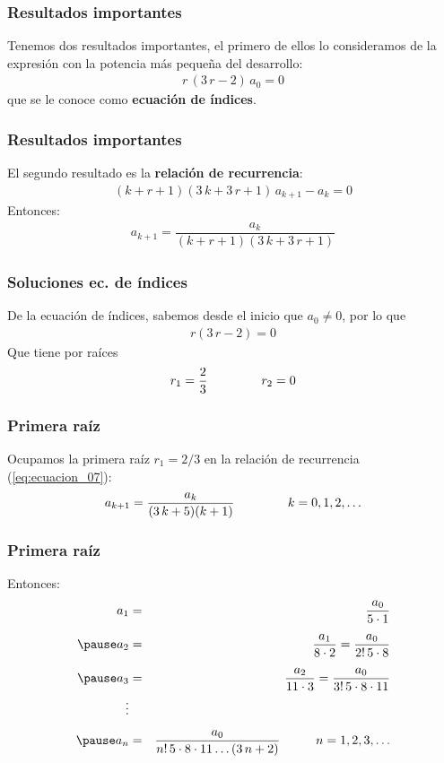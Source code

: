 \begin{frame}
\frametitle{Resultados importantes}
Tenemos dos resultados importantes, el primero de ellos lo consideramos de la expresión con la potencia más pequeña del desarrollo:
\begin{align*}
r \, (3 \, r - 2) \, a_{0} = 0
\end{align*}
que se le conoce como \textbf{ecuación de índices}.
\end{frame}
\begin{frame}
\frametitle{Resultados importantes}
El segundo resultado es la \textbf{relación de recurrencia}:
\begin{align*}
(k + r + 1)(3 \, k + 3 \, r + 1) \, a_{k+1} - a_{k} = 0
\end{align*}
\pause
Entonces:
\begin{align}
a_{k+1} = \dfrac{a_{k}}{(k + r + 1)(3 \, k + 3 \, r + 1)}
\label{eq:ecuacion_07}
\end{align}
\end{frame}
\begin{frame}
\frametitle{Soluciones ec. de índices}
De la ecuación de índices, sabemos desde el inicio que $a_{0} \neq 0$, por lo que
\begin{align}
r (3 \, r - 2) = 0
\label{eq:ecuacion_06}
\end{align}
\pause
Que tiene por raíces
\begin{align*}
r_{1} = \dfrac{2}{3} \hspace{1.5cm} r_{2} = 0
\end{align*}
\end{frame}
\begin{frame}
\frametitle{Primera raíz}
Ocupamos la primera raíz $r_{1} = 2/3$ en la relación de recurrencia (\ref{eq:ecuacion_07}):
\begin{align}
a_{k+1} = \dfrac{a_{k}}{(3 \, k + 5)(k + 1)} \hspace{1.5cm} k = 0, 1, 2, \ldots
\label{eq:ecuacion_08}    
\end{align}
\end{frame}
\begin{frame}
\frametitle{Primera raíz}
Entonces:
\begin{eqnarray*}
a_{1} &=& \dfrac{a_{0}}{5 \cdot 1} \\[0.5em] \pause
a_{2} &=& \dfrac{a_{1}}{8 \cdot 2} = \dfrac{a_{0}}{2! \, 5 \cdot 8} \\[0.5em] \pause
a_{3} &=& \dfrac{a_{2}}{11 \cdot 3} = \dfrac{a_{0}}{3! \, 5 \cdot 8 \cdot 11} \\
\vdots \\[0.5em] \pause
a_{n} &=& \dfrac{a_{0}}{n! \, 5 \cdot 8 \cdot 11 \ldots (3\, n + 2)} \hspace{1cm} n = 1, 2, 3, \ldots
\end{eqnarray*}
\end{frame}
